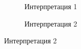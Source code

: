 \documentclass{article}
\begin{document}
\begin{articletext}
\bfullwidth
\begin{figure}
        \centering
        \begin{subfigure}[b]{0.33\textwidth}
                \caption{Интерпретация 1}
        \end{subfigure}%
        \quad%
        \begin{subfigure}[b]{0.39\textwidth}
                \caption{Интерпретация 2}
        \end{subfigure}
\end{figure}
\efullwidth


\end{articletext}
\end{document}
